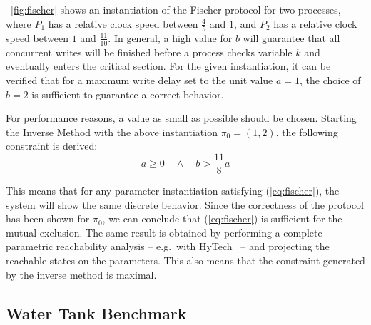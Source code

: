 \documentclass{llncs}
\begin{document}
\figurename~\ref{fig:fischer} shows an instantiation of the Fischer
protocol for two processes, where $P_1$ has a relative clock speed
between $\frac{4}{5}$ and $1$, and $P_2$ has a relative clock speed
between $1$ and $\frac{11}{10}$. In general, a high value for $b$ will
guarantee that all concurrent writes will be finished before a process
checks variable $k$ and eventually enters the critical section. For
the given instantiation, it can be verified that for a maximum write
delay set to the unit value $a=1$, the choice of $b=2$ is sufficient
to guarantee a correct behavior. 

For performance reasons, a value as small as possible should be
chosen.  Starting the Inverse Method with the above instantiation
$\pi_0 = (1,2)$, the following constraint is derived:
\begin{equation}\label{eq:fischer}
  a \geq 0 \quad \wedge \quad b > \frac{11}{8} a
\end{equation}

This means that for any parameter instantiation satisfying
(\ref{eq:fischer}), the system will show the same discrete
behavior. Since the correctness of the protocol has been shown for
$\pi_0$, we can conclude that (\ref{eq:fischer}) is sufficient for the
mutual exclusion. The same result is obtained by performing a complete
parametric reachability analysis -- e.g.~with HyTech~\cite{HHW:97} --
and projecting the reachable states on the parameters. This also means
that the constraint generated by the inverse method is maximal.

\subsection{Water Tank Benchmark}
\end{document}
